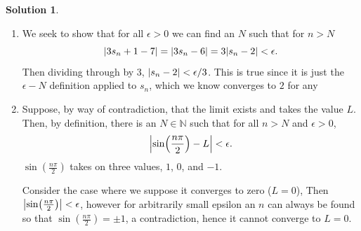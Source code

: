 \documentclass[10pt]{article}
\theoremstyle{definition}
\newtheorem{soln}{Solution}
\begin{document}
\begin{soln}
\begin{enumerate}[label=(\alph*)]
          Here we restrict to $n>1$ so we can remove the absolute value as $n^5-7$ is only positive from there on.
          To solve for $n$ here it will be easier if we can establish some other $S'_n$ like
          $$\frac{2n^2+8}{n^5-7}<S'_n<\epsilon.$$
          To do this we establish something that bounds the numerator above (and so is always greater than it, under the condition $n>1$)
          and bounds the denominator below (and so is always less than it, making the fraction overall larger).
          The numerator is bounded above by $5n^2$ for $n>1$ (to be careful, $n\geq 2$, as their intersection is between $1$ and $2$, but $n\in \mathbb{N}$)
          and the denominator is bounded below by $n^3$ for $n>1$ hence
          $$\frac{2n^2+8}{n^5-7}<\frac{5n^2}{n^3}<\epsilon.$$
          Rearranging
          $$\frac{5}{\epsilon}<n.$$
          \begin{proof}
            Consider $N=\max\{2, 5/\epsilon\}$ so that $n\geq 2$. $n>N$ implies that
            $$n>5/\epsilon\implies \frac{5}{n}<\epsilon.$$
            Certainly then
            $$\frac{5n^2}{n^3}<\epsilon$$
            and since we force $n>1$
            $n^3<n^5<n^5-7$ and $5n^2>2n^2+8$, the first being evident from the degrees of $n$ and the second becoming clear when
            considering the derivatives of both sides as $10n>4n$. Hence
            $$\frac{2n^2+8}{n^5-7}<\frac{5n^2}{n^3}<\epsilon$$
            and hence
            $$\abs{\frac{2n^2+8}{n^5-7}}<\epsilon.$$
            \qedhere
          \end{proof}
    \item We seek to show that for all $\epsilon >0$ we can find an $N$ such that for $n>N$
          $$\abs{3s_n+1-7}=\abs{3s_n-6}=3\abs{s_n-2}<\epsilon.$$
          Then dividing through by $3$, $\abs{s_n-2}<\epsilon/3$.
          This is true since it is just the $\epsilon-N$ definition applied to $s_n$, which we know converges to $2$ for any
    \item Suppose, by way of contradiction, that the limit exists and takes the value $L$. Then, by definition, there is an
          $N\in\mathbb{N}$ such that for all $n>N$ and $\epsilon>0$,
          $$\abs{\sin(\frac{n\pi}{2})-L}< \epsilon.$$
          $\sin(\frac{n\pi}{2})$ takes on three values, $1$, $0$, and $-1$.


          Consider the case where we suppose it converges to zero ($L=0$),
          Then $\abs{\sin(\frac{n\pi}{2})}<\epsilon$, however for arbitrarily small epsilon an $n$ can always be found so that
          $\sin(\frac{n\pi}{2})=\pm 1$, a contradiction, hence it cannot converge to $L=0$.



\end{enumerate}
\end{soln}
\end{document}
